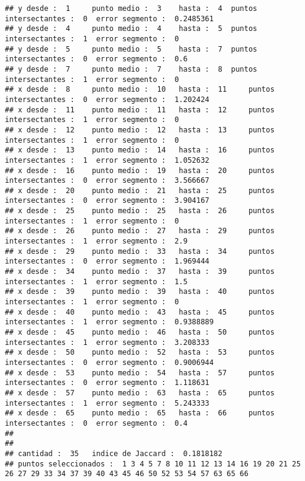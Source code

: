 \documentclass[]{article}
\begin{document}
\begin{verbatim}
## y desde :  1     punto medio :  3    hasta :  4  puntos intersectantes :  0  error segmento :  0.2485361 
## y desde :  4     punto medio :  4    hasta :  5  puntos intersectantes :  1  error segmento :  0 
## y desde :  5     punto medio :  5    hasta :  7  puntos intersectantes :  0  error segmento :  0.6 
## y desde :  7     punto medio :  7    hasta :  8  puntos intersectantes :  1  error segmento :  0 
## x desde :  8     punto medio :  10   hasta :  11     puntos intersectantes :  0  error segmento :  1.202424 
## x desde :  11    punto medio :  11   hasta :  12     puntos intersectantes :  1  error segmento :  0 
## x desde :  12    punto medio :  12   hasta :  13     puntos intersectantes :  1  error segmento :  0 
## x desde :  13    punto medio :  14   hasta :  16     puntos intersectantes :  1  error segmento :  1.052632 
## x desde :  16    punto medio :  19   hasta :  20     puntos intersectantes :  0  error segmento :  3.566667 
## x desde :  20    punto medio :  21   hasta :  25     puntos intersectantes :  0  error segmento :  3.904167 
## x desde :  25    punto medio :  25   hasta :  26     puntos intersectantes :  1  error segmento :  0 
## x desde :  26    punto medio :  27   hasta :  29     puntos intersectantes :  1  error segmento :  2.9 
## x desde :  29    punto medio :  33   hasta :  34     puntos intersectantes :  0  error segmento :  1.969444 
## x desde :  34    punto medio :  37   hasta :  39     puntos intersectantes :  1  error segmento :  1.5 
## x desde :  39    punto medio :  39   hasta :  40     puntos intersectantes :  1  error segmento :  0 
## x desde :  40    punto medio :  43   hasta :  45     puntos intersectantes :  1  error segmento :  0.9388889 
## x desde :  45    punto medio :  46   hasta :  50     puntos intersectantes :  1  error segmento :  3.208333 
## x desde :  50    punto medio :  52   hasta :  53     puntos intersectantes :  0  error segmento :  0.9006944 
## x desde :  53    punto medio :  54   hasta :  57     puntos intersectantes :  0  error segmento :  1.118631 
## x desde :  57    punto medio :  63   hasta :  65     puntos intersectantes :  1  error segmento :  5.243333 
## x desde :  65    punto medio :  65   hasta :  66     puntos intersectantes :  0  error segmento :  0.4 
## 
## 
## cantidad :  35   indice de Jaccard :  0.1818182 
## puntos seleccionados :  1 3 4 5 7 8 10 11 12 13 14 16 19 20 21 25 26 27 29 33 34 37 39 40 43 45 46 50 52 53 54 57 63 65 66
\end{verbatim}
\end{document}
